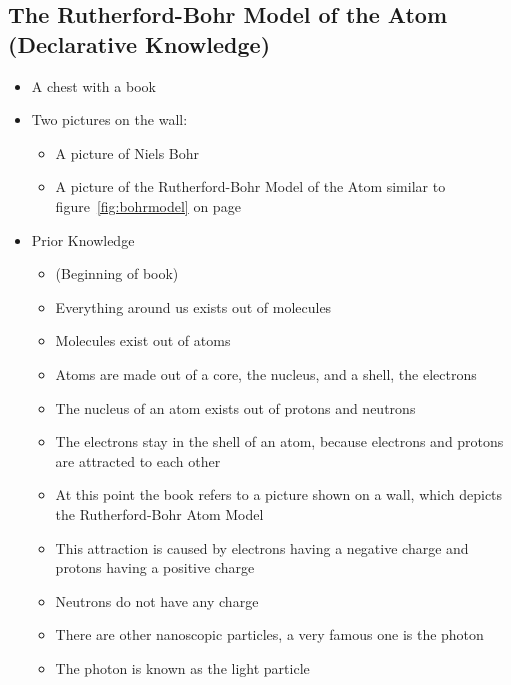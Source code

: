 \documentclass[11pt,twoside]{report} %
\begin{document}
\subsection{The Rutherford-Bohr Model of the Atom (Declarative Knowledge)}
\begin{itemize}
	\item A chest with a book
	\item Two pictures on the wall:
	\begin{itemize}
		\item A picture of Niels Bohr
		\item A picture of the Rutherford-Bohr Model of the Atom similar to figure~\ref{fig:bohrmodel} on page~\pageref{fig:bohrmodel}
	\end{itemize}
	\item Prior Knowledge
	\begin{itemize}
		\item (Beginning of book)
		\item Everything around us exists out of molecules
		\item Molecules exist out of atoms
		\item Atoms are made out of a core, the nucleus, and a shell, the electrons
		\item The nucleus of an atom exists out of protons and neutrons
		\item The electrons stay in the shell of an atom, because electrons and protons are attracted to each other
		\item At this point the book refers to a picture shown on a wall, which depicts the Rutherford-Bohr Atom Model
		\item This attraction is caused by electrons having a negative charge and protons having a positive charge
		\item Neutrons do not have any charge
		\item There are other nanoscopic particles, a very famous one is the photon
		\item The photon is known as the light particle
	\end{itemize}
\end{itemize}
\end{document}

